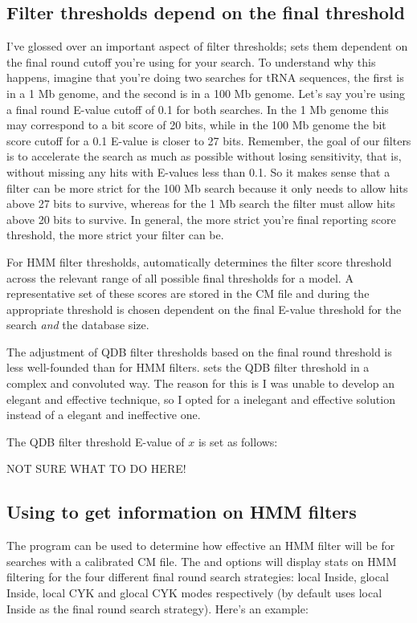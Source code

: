 \subsection{Filter thresholds depend on the final threshold}
I've glossed over an important aspect of filter thresholds;
 sets them dependent on the final round cutoff you're
using for your search. To understand why this happens, imagine that
you're doing two searches for tRNA sequences, the first is in a 1 Mb
genome, and the second is in a 100 Mb genome. Let's say you're using a
final round E-value cutoff of 0.1 for both searches. In the 1 Mb
genome this may correspond to a bit score of 20 bits, while in the 100 Mb
genome the bit score cutoff for a 0.1 E-value is closer to 27
bits. Remember, the goal of our filters is to accelerate the search as
much as possible without losing sensitivity, that is, without missing
any hits with E-values less than 0.1.  So it makes sense that
a filter can be more strict for the 100 Mb search because it only
needs to allow hits above 27 bits to survive, whereas for the 1
Mb search the filter must allow hits above 20 bits to survive. In
general, the more strict you're final reporting score threshold, the
more strict your filter can be.

For HMM filter thresholds,  automatically determines
the filter score threshold across the relevant range of all possible
final thresholds for a model. A representative set of these scores are
stored in the CM file and during  the appropriate
threshold is chosen dependent on the final E-value threshold for the
search \emph{and} the database size.

The adjustment of QDB filter thresholds based on the final round
threshold is less well-founded than for HMM filters. 
sets the QDB filter threshold in a complex and convoluted way. The
reason for this is I was unable to develop an elegant and effective
technique, so I opted for a inelegant and effective solution
instead of a elegant and ineffective one. 

The QDB filter threshold E-value of $x$ is set as follows: 

NOT SURE WHAT TO DO HERE!

\subsection{Using  to get information on HMM filters}

The  program can be used to determine how effective an
HMM filter will be for searches with a calibrated CM file. The
 and  options will display stats on
HMM filtering for the four different final round search strategies:
local Inside, glocal Inside, local CYK and glocal CYK modes
respectively (by default  uses local Inside as the
final round search strategy). Here's an example:


